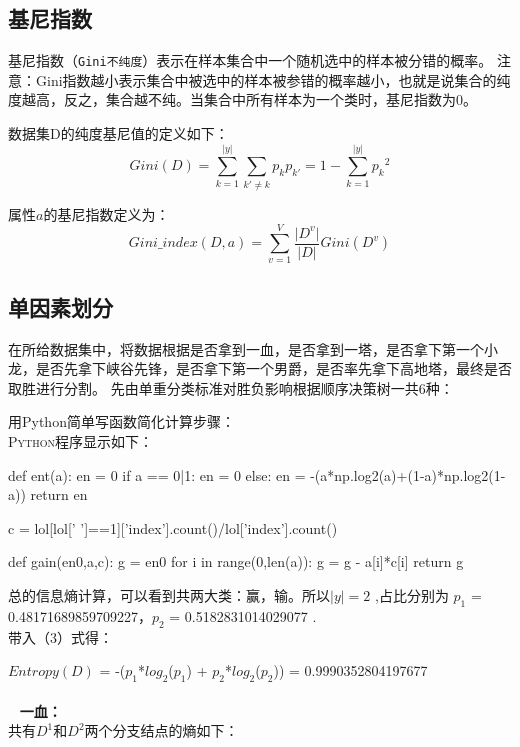 \documentclass[lang=cn,11pt]{elegantpaper}
\begin{document}
\subsection{基尼指数}
基尼指数（\lstinline{Gini不纯度}）表示在样本集合中一个随机选中的样本被分错的概率。
注意：Gini指数越小表示集合中被选中的样本被参错的概率越小，也就是说集合的纯度越高，反之，集合越不纯。当集合中所有样本为一个类时，基尼指数为0。

数据集D的纯度基尼值的定义如下：
\begin{equation}
Gini(D) = \sum_{k = 1}^{|y|} \sum_{k' \neq k} p_k p_{k'} = 1 - \sum_{k = 1}^{|y|} {p_k}^2   \label{eq:binom}
\end{equation}

属性$a$的基尼指数定义为：
\begin{equation}
Gini\_ index(D,a) = \sum_{v = 1}^{V}  \frac{\lvert D^v \rvert}{\lvert D \rvert} Gini(D^v)   \label{eq:binom}
\end{equation}

\subsection{单因素划分}
在所给数据集中，将数据根据是否拿到一血，是否拿到一塔，是否拿下第一个小龙，是否先拿下峡谷先锋，是否拿下第一个男爵，是否率先拿下高地塔，最终是否取胜进行分割。
先由单重分类标准对胜负影响根据顺序决策树一共6种：

用Python简单写函数简化计算步骤：\\
\textsc{Python}程序显示如下：
\begin{python}
def ent(a):
    en = 0
    if a == 0|1:
        en = 0
    else:
        en = -(a*np.log2(a)+(1-a)*np.log2(1-a))
    return en

c = lol[lol[' ']==1]['index'].count()/lol['index'].count()

def gain(en0,a,c):
    g = en0
    for i in range(0,len(a)):
        g = g - a[i]*c[i]
    return g
\end{python}

总的信息熵计算，可以看到共两大类：赢，输。所以$\lvert y \rvert=2$ ,占比分别为 $p_1$ = 0.48171689859709227，$p_2$ =  0.5182831014029077 .\\
带入（3）式得：

$Entropy(D)$ = -($p_1$*$log_2$($p_1$) + $p_2$*$log_2$($p_2$)) = 0.9990352804197677
\\~
\\~
\textbf{一血：}\\
\quad 共有$D^1$和$D^2$两个分支结点的熵如下：
\end{document}
